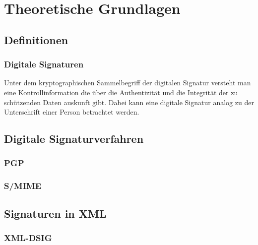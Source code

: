 \chapter{Theoretische Grundlagen}
\label{chp:TheoretischeGrundlagen}

\section{Definitionen}

\subsection{Digitale Signaturen}
Unter dem kryptographischen Sammelbegriff der digitalen Signatur versteht man eine Kontrollinformation die über die Authentizität und die Integrität der zu
schützenden Daten auskunft gibt\cite{itgk:bsi}. Dabei kann eine digitale Signatur analog zu der Unterschrift einer Person betrachtet werden\cite{kits}. 


\section{Digitale Signaturverfahren}
\label{sec:thg:dsv}


\subsection{PGP}
\label{sec:thg:dsv:pgp}

\subsection{S/MIME}
\label{sec:thg:dsv:smime}


\section{Signaturen in XML}
\label{sec:thg:xml}


\subsection{XML-DSIG}
\label{sec:thg:xml:dsig}
